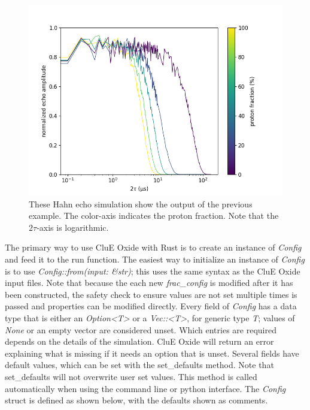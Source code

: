 \documentclass{book}
\begin{document}
\begin{figure} [H]
	\centering
	\includegraphics[width=0.75\linewidth]{figs/fig_CluE-proton_fractions.png}
  \caption{These Hahn echo simulation show the output of the previous example.
  The color-axis indicates the proton fraction.
  Note that the $2\tau$-axis is logarithmic.
  }
  \label{fig:rust_out}
\end{figure}
%
The primary way to use CluE Oxide with Rust is to create an instance of 
\textit{Config} and feed it to the run function.
The easiest way to initialize an instance of \textit{Config} is to use 
\textit{Config::from(input: \&str)}; this uses the same syntax as the 
CluE Oxide input files. 
Note that because the each new \textit{frac\_config} is modified after it
has been constructed, the safety check to ensure values are not set multiple 
times is passed and properties can be modified directly.
Every field of \textit{Config} has a data type that is either an 
\textit{Option<T>} or a \textit{Vec::<T>}, for generic type \textit{T}; 
values of \textit{None} or an empty vector are considered unset.
Which entries are required depends on the details of the simulation.
CluE Oxide will return an error explaining what is missing if it needs an option that
is unset.  Several fields have default values, which can be set with the
set\_defaults method.  
Note that set\_defaults will not overwrite user set values.  
This method is called automatically when using the command line or python
interface.
The \textit{Config} struct is defined as shown below, with the defaults shown 
as comments.    
\end{document}
